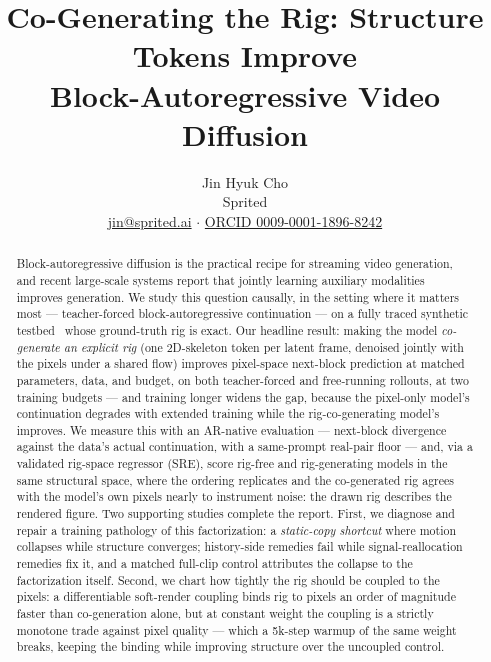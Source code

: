 \documentclass[10pt,twocolumn]{article}
\title{\vspace{-1.5em}\textbf{Co-Generating the Rig: Structure Tokens Improve\\Block-Autoregressive Video Diffusion}}
\author{Jin Hyuk Cho\\Sprited\\\small\href{mailto:jin@sprited.ai}{jin@sprited.ai} $\cdot$
\href{https://orcid.org/0009-0001-1896-8242}{ORCID 0009-0001-1896-8242}}
\date{}
\begin{document}
\raggedbottom\maketitle\vspace{-1.25em}

\begin{abstract}
Block-autoregressive diffusion is the practical recipe for streaming video generation, and recent large-scale systems
report that jointly learning auxiliary modalities improves generation. We study this question causally, in the
setting where it matters most — teacher-forced block-autoregressive continuation — on a fully traced synthetic
testbed~\cite{cho2026dsf} whose ground-truth rig is exact. Our headline result: making the model \emph{co-generate an
explicit rig} (one 2D-skeleton token per latent frame, denoised jointly with the pixels under a shared flow) improves
pixel-space next-block prediction at matched parameters, data, and budget, on both teacher-forced and free-running
rollouts, at two training budgets — and training longer widens the gap, because the pixel-only model's continuation
degrades with extended training while the rig-co-generating model's improves.
We measure this with an AR-native evaluation — next-block divergence against the data's actual continuation, with a
same-prompt real-pair floor — and, via a validated rig-space regressor (SRE), score rig-free and rig-generating
models in the same structural space, where the ordering replicates and the co-generated rig agrees with the model's
own pixels nearly to instrument noise: the drawn rig describes the rendered figure.
Two supporting studies complete the report. First, we diagnose and repair a training pathology of this factorization:
a \emph{static-copy shortcut} where motion collapses while structure converges; history-side remedies fail while
signal-reallocation remedies fix it, and a matched full-clip control attributes the collapse to the factorization
itself. Second, we chart how tightly the rig should be coupled to the pixels: a differentiable soft-render coupling
binds rig to pixels an order of magnitude faster than co-generation alone, but at constant weight the coupling is a
strictly monotone trade against pixel quality — which a 5k-step warmup of the same weight breaks, keeping the
binding while improving structure over the uncoupled control.
\end{abstract}
\end{document}
